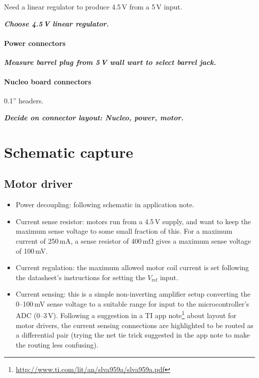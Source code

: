 \documentclass[a4paper,11pt,article]{memoir}
\newcommand{\todo}[1]{{\color{red}\textit{\textbf{#1}}}}
\begin{document}
Need a linear regulator to produce 4.5\,V from a 5\,V input.

\todo{Choose 4.5\,V linear regulator.}

\paragraph{Power connectors}

\todo{Measure barrel plug from 5\,V wall wart to select barrel jack.}

\paragraph{Nucleo board connectors}

0.1'' headers.

\todo{Decide on connector layout: Nucleo, power, motor.}


\section*{Schematic capture}

\subsection*{Motor driver}

\begin{itemize}
  \item{Power decoupling: following schematic in application note.}
  \item{Current sense resistor: motors run from a 4.5\,V supply, and
    want to keep the maximum sense voltage to some small fraction of
    this. For a maximum current of 250\,mA, a sense resistor of
    400\,$\mathrm{m\Omega}$ gives a maximum sense voltage of 100\,mV.}
  \item{Current regulation: the maximum allowed motor coil current is
    set following the datasheet's instructions for setting the
    $V_\mathrm{ref}$ input.}
  \item{Current sensing: this is a simple non-inverting amplifier
    setup converting the 0--100\,mV sense voltage to a suitable range
    for input to the microcontroller's ADC (0--3\,V). Following a
    suggestion in a TI app
    note\footnote{\url{http://www.ti.com/lit/an/slva959a/slva959a.pdf}}
    about layout for motor drivers, the current sensing connections
    are highlighted to be routed as a differential pair (trying the
    net tie trick suggested in the app note to make the routing less
    confusing).}
\end{itemize}
\end{document}

